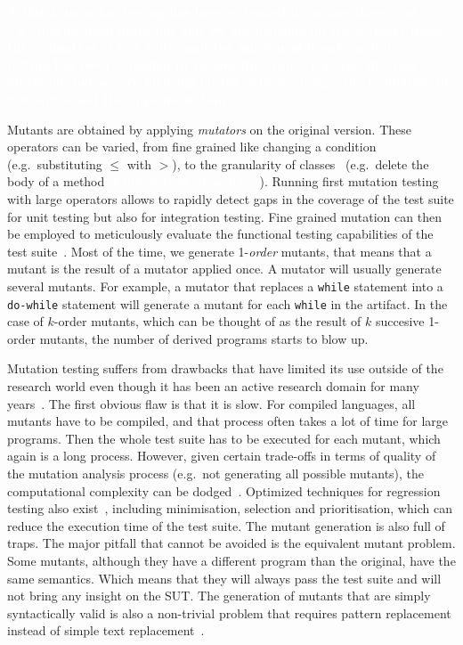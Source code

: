 \documentclass[11pt]{sdm_internship}
\newcommand{\addref}[1]{\colorbox{TealBlue!100}{\textcolor{white}{\textbf{$[$\ifx&#1&\ \else#1\fi$]$}}}}
\newcommand{\todo}[1]{\colorbox{Red!75}{\textcolor{white}{\textbf{TODO\ifx&#1&\else: #1\fi}}}}
\theoremstyle{definition}
\begin{document}
\todo{mutation testing has been extended in various directions, e.g.\ specification mutation, but we are focusing on the primary usage, the evaluation of test suites and the implementation}

Mutants are obtained by applying \emph{mutators} on the original version.
These operators can be varied, from fine grained like changing a condition (e.g.\ substituting $\leq$ with $>$), to the granularity of classes~\cite{segura2011mutation} (e.g.\ delete the body of a method \addref{descartes}).
Running first mutation testing with large operators allows to rapidly detect gaps in the coverage of the test suite for unit testing but also for integration testing.
Fine grained mutation can then be employed to meticulously evaluate the functional testing capabilities of the test suite~\cite{howden1982weak}.
Most of the time, we generate 1-\emph{order} mutants, that means that a mutant is the result of a mutator applied once.
A mutator will usually generate several mutants.
For example, a mutator that replaces a \texttt{while} statement into a \texttt{do-while} statement will generate a mutant for each \texttt{while} in the artifact.
In the case of $k$-order mutants, which can be thought of as the result of $k$ succesive 1-order mutants\cite{wah2000theoretical}, the number of derived programs starts to blow up.

Mutation testing suffers from drawbacks that have limited its use outside of the research world even though it has been an active research domain for many years~\cite{jia2011analysis}.
The first obvious flaw is that it is slow.
For compiled languages, all mutants have to be compiled, and that process often takes a lot of time for large programs.
Then the whole test suite has to be executed for each mutant, which again is a long process.
However, given certain trade-offs in terms of quality of the mutation analysis process (e.g.\ not generating all possible mutants), the computational complexity can be dodged~\cite{offutt1993experimental,movzucha2016mutation}.
Optimized techniques for regression testing also exist~\cite{yoo2012regression}, including minimisation, selection and prioritisation, which can reduce the execution time of the test suite.
The mutant generation is also full of traps.
The major pitfall that cannot be avoided is the equivalent mutant problem.
Some mutants, although they have a different program than the original, have the same semantics.
Which means that they will always pass the test suite and will not bring any insight on the SUT\@.
The generation of mutants that are simply syntactically valid is also a non-trivial problem that requires pattern replacement instead of simple text replacement~\cite{simao2009transformational}.
\end{document}
